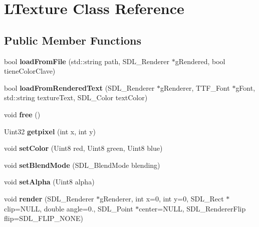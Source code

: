 \hypertarget{class_l_texture}{}\section{L\+Texture Class Reference}
\label{class_l_texture}
\subsection*{Public Member Functions}
\begin{DoxyCompactItemize}
\item 
bool {\bfseries load\+From\+File} (std\+::string path, S\+D\+L\+\_\+\+Renderer $\ast$g\+Rendered, bool tiene\+Color\+Clave)\hypertarget{class_l_texture_a25b90cb830a0d7a5705a72da006a9571}{}\label{class_l_texture_a25b90cb830a0d7a5705a72da006a9571}

\item 
bool {\bfseries load\+From\+Rendered\+Text} (S\+D\+L\+\_\+\+Renderer $\ast$g\+Renderer, T\+T\+F\+\_\+\+Font $\ast$g\+Font, std\+::string texture\+Text, S\+D\+L\+\_\+\+Color text\+Color)\hypertarget{class_l_texture_a1ef989f4fc5f7f8c0897203437219a8b}{}\label{class_l_texture_a1ef989f4fc5f7f8c0897203437219a8b}

\item 
void {\bfseries free} ()\hypertarget{class_l_texture_abef558f0b920270079925548a3976a06}{}\label{class_l_texture_abef558f0b920270079925548a3976a06}

\item 
Uint32 {\bfseries getpixel} (int x, int y)\hypertarget{class_l_texture_ad26a88237a60b3bbc1822bb4e1f47048}{}\label{class_l_texture_ad26a88237a60b3bbc1822bb4e1f47048}

\item 
void {\bfseries set\+Color} (Uint8 red, Uint8 green, Uint8 blue)\hypertarget{class_l_texture_a4ccf201515ecb158b137394d41ed9077}{}\label{class_l_texture_a4ccf201515ecb158b137394d41ed9077}

\item 
void {\bfseries set\+Blend\+Mode} (S\+D\+L\+\_\+\+Blend\+Mode blending)\hypertarget{class_l_texture_aa1fe07070f715bf3981c129ae1619a4e}{}\label{class_l_texture_aa1fe07070f715bf3981c129ae1619a4e}

\item 
void {\bfseries set\+Alpha} (Uint8 alpha)\hypertarget{class_l_texture_ab4e51b54752ae7b54614078f9128a9c0}{}\label{class_l_texture_ab4e51b54752ae7b54614078f9128a9c0}

\item 
void {\bfseries render} (S\+D\+L\+\_\+\+Renderer $\ast$g\+Renderer, int x=0, int y=0, S\+D\+L\+\_\+\+Rect $\ast$clip=N\+U\+LL, double angle=0., S\+D\+L\+\_\+\+Point $\ast$center=N\+U\+LL, S\+D\+L\+\_\+\+Renderer\+Flip flip=S\+D\+L\+\_\+\+F\+L\+I\+P\+\_\+\+N\+O\+NE)\hypertarget{class_l_texture_a7edbf22bd4e3f5efd60e20b913d1dcc4}{}\label{class_l_texture_a7edbf22bd4e3f5efd60e20b913d1dcc4}


\end{DoxyCompactItemize}
